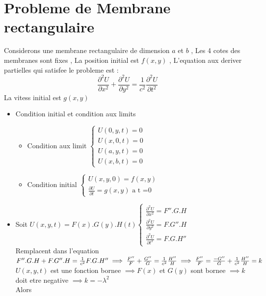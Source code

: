 \documentclass[12pt]{book}
\begin{document}
        \section{Probleme de Membrane rectangulaire}
            Considerons une membrane rectangulaire de dimension $a$ et $b$ , Les 4 cotes des membranes sont fixes , La position initial est $f(x,y)$ , L'equation aux deriver partielles qui satisfee le probleme est :
            \[ \frac{\partial^2 U}{\partial x^2}+\frac{\partial^2 U}{\partial y^2}=\frac{1}{c^2}\frac{\partial^2U}{\partial t^2} \]
            La vitess initial est $g(x,y)$ 
            \begin{itemize}
                \item Condition initial et condition aux limits 
                    \begin{itemize}
                        \item Condition aux limit $\begin{cases} U(0,y,t) = 0 \\ U(x,0,t) = 0 \\ U(a,y,t) =0 \\ U(x,b,t)=0 \end{cases}$
                        \item Condition initial $\begin{cases} U(x,y,0) = f(x,y) \\ \frac{\partial U}{\partial t} = g(x,y) \text{ a t =0 }\end{cases}$
                    \end{itemize}
                \item Soit $U(x,y,t)=F(x).G(y).H(t) \begin{cases} \frac{\partial^2U}{\partial x^2}=F''.G.H \\ \frac{\partial^2 U}{\partial y^2}=F.G''.H\\ \frac{\partial^2U}{\partial t^2}=F.G.H'' \end{cases}$ \\
                    Remplacent dans l'equation $F''.G.H + F.G''.H = \frac{1}{c^2}F.G.H'' \\
                    \implies \frac{F''}{F}+\frac{G''}{G} = \frac{1}{c^2}\frac{H''}{H} \implies \frac{F''}{F}=\frac{-G''}{G}+\frac{1}{c^2}\frac{H''}{H}=k$ \\
                    $U(x,y,t)$ est une fonction bornee $ \implies F(x)$ et $ G(y) $ sont bornee $\implies k $ doit etre negative $ \implies k = -\lambda^2 $ \\
                    Alors \begin{itemize}

\end{itemize}
\end{itemize}
\end{document}
